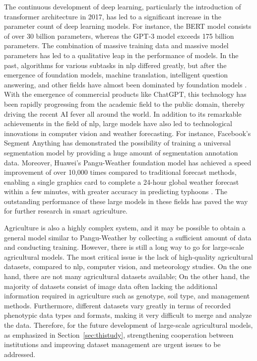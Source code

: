   The continuous development of deep learning, 
  particularly the introduction of transformer architecture in 2017, 
  has led to a significant increase in the parameter count of deep learning models. 
  For instance, the BERT model \citep{devlin_bert_2018} consists of over 30 billion parameters, 
  whereas the GPT-3 model \citep{brown_language_2020} exceeds 175 billion parameters.
  The combination of massive training data and massive model parameters has led to a qualitative leap in the performance of models. 
  In the past, algorithms for various subtasks in \gls{nlp} differed greatly, 
  but after the emergence of foundation models, machine translation, intelligent question answering, and other fields have almost been dominated by foundation models \citep{bommasani_opportunities_2021}.
  With the emergence of commercial products like ChatGPT, 
  this technology has been rapidly progressing from the academic field to the public domain, thereby driving the recent AI fever all around the world.
  In addition to its remarkable achievements in the field of \gls{nlp}, 
  large models have also led to technological innovations in computer vision and weather forecasting. 
  For instance, Facebook's Segment Anything \citep{kirillov_segment_2023} has demonstrated the possibility of training a universal segmentation model by providing a huge amount of segmentation annotation data. 
  Moreover, Huawei's Pangu-Weather foundation model has achieved a speed improvement of over 10,000 times compared to traditional forecast methods, 
  enabling a single graphics card to complete a 24-hour global weather forecast within a few minutes, 
  with greater accuracy in predicting typhoons \citep{bi_accurate_2023}. The outstanding performance of these large models in these fields has paved the way for further research in smart agriculture.



  Agriculture is also a highly complex system, and it may be possible to obtain a general model similar to Pangu-Weather by collecting a sufficient amount of data and conducting training. 
  However, there is still a long way to go for large-scale agricultural models. 
  The most critical issue is the lack of high-quality agricultural datasets, 
  compared to \gls{nlp}, computer vision, and meteorology studies. 
  On the one hand, there are not many agricultural datasets available; 
  On the other hand, the majority of datasets consist of image data 
  often lacking the additional information required in agriculture such as genotype, soil type, and management methods. 
  Furthermore, different datasets vary greatly in terms of recorded phenotypic data types and formats, 
  making it very difficult to merge and analyze the data. 
  Therefore, for the future development of large-scale agricultural models, as emphasized in Section~\ref{sec:thistudy}, strengthening cooperation between institutions and improving dataset management are urgent issues to be addressed.

